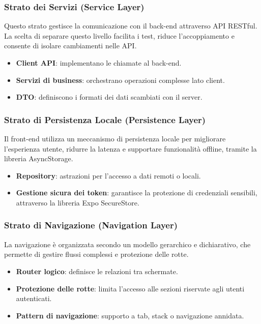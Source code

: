 \documentclass{book}
\begin{document}
\subsubsection{Strato dei Servizi (Service Layer)}
Questo strato gestisce la comunicazione con il back-end attraverso API RESTful. La scelta di separare questo livello facilita i test, riduce l’accoppiamento e consente di isolare cambiamenti nelle API.
\begin{itemize}
    \item \textbf{Client API}: implementano le chiamate al back-end.
    \item \textbf{Servizi di business}: orchestrano operazioni complesse lato client.
    \item \textbf{DTO}: definiscono i formati dei dati scambiati con il server.
\end{itemize}

\subsubsection{Strato di Persistenza Locale (Persistence Layer)}
Il front-end utilizza un meccanismo di persistenza locale per migliorare l’esperienza utente, ridurre la latenza e supportare funzionalità offline, tramite la libreria AsyncStorage.
\begin{itemize}
    \item \textbf{Repository}: astrazioni per l’accesso a dati remoti o locali.
    \item \textbf{Gestione sicura dei token}: garantisce la protezione di credenziali sensibili, attraverso la libreria Expo SecureStore.
\end{itemize}

\subsubsection{Strato di Navigazione (Navigation Layer)}
La navigazione è organizzata secondo un modello gerarchico e dichiarativo, che permette di gestire flussi complessi e protezione delle rotte.
\begin{itemize}
    \item \textbf{Router logico}: definisce le relazioni tra schermate.
    \item \textbf{Protezione delle rotte}: limita l’accesso alle sezioni riservate agli utenti autenticati.
    \item \textbf{Pattern di navigazione}: supporto a tab, stack o navigazione annidata.
\end{itemize}
\end{document}
